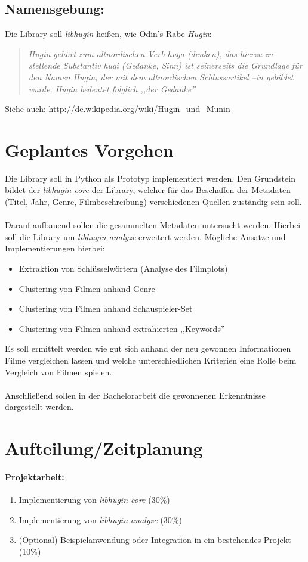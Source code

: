 \documentclass[8pt,a4paper,ngerman]{scrartcl}
\begin{document}
\subsection{Namensgebung:}
Die Library soll \emph{libhugin} heißen, wie Odin's Rabe \emph{Hugin}:
\begin{quote}
    \textit{Hugin gehört zum altnordischen Verb huga (denken), das hierzu zu
    stellende Substantiv hugi (Gedanke, Sinn) ist seinerseits die Grundlage für
    den Namen Hugin, der mit dem altnordischen Schlussartikel –in gebildet wurde.
    Hugin bedeutet folglich ,,der Gedanke''}
\end{quote}
Siehe auch: \url{http://de.wikipedia.org/wiki/Hugin\_und\_Munin}

\section{Geplantes Vorgehen}
Die Library soll in Python als Prototyp implementiert werden. Den Grundstein
bildet der \emph{libhugin-core} der Library, welcher für das Beschaffen der
Metadaten (Titel, Jahr, Genre, Filmbeschreibung) verschiedenen Quellen
zuständig sein soll.
\\
\\
Darauf aufbauend sollen die gesammelten Metadaten untersucht werden. Hierbei
soll die Library um \emph{libhugin-analyze} erweitert werden. Mögliche Ansätze und
Implementierungen hierbei:
\begin{itemize}
    \item Extraktion von Schlüsselwörtern (Analyse des Filmplots)
    \item Clustering von Filmen anhand Genre
    \item Clustering von Filmen anhand Schauspieler-Set
    \item Clustering von Filmen anhand extrahierten ,,Keywords''
\end{itemize}
Es soll ermittelt werden wie gut sich anhand der neu gewonnen
Informationen Filme vergleichen lassen und welche unterschiedlichen Kriterien
eine Rolle beim Vergleich von Filmen spielen. 
\\
\\
Anschließend sollen in der Bachelorarbeit die gewonnenen Erkenntnisse dargestellt
werden. 

\section{Aufteilung/Zeitplanung}
\paragraph{Projektarbeit:}
\begin{enumerate} 
    \item Implementierung von \emph{libhugin-core} (30\%)
    \item Implementierung von \emph{libhugin-analyze} (30\%)
    \item (Optional) Beispielanwendung oder Integration in ein
        bestehendes Projekt (10\%)
\end{enumerate}
\end{document}
